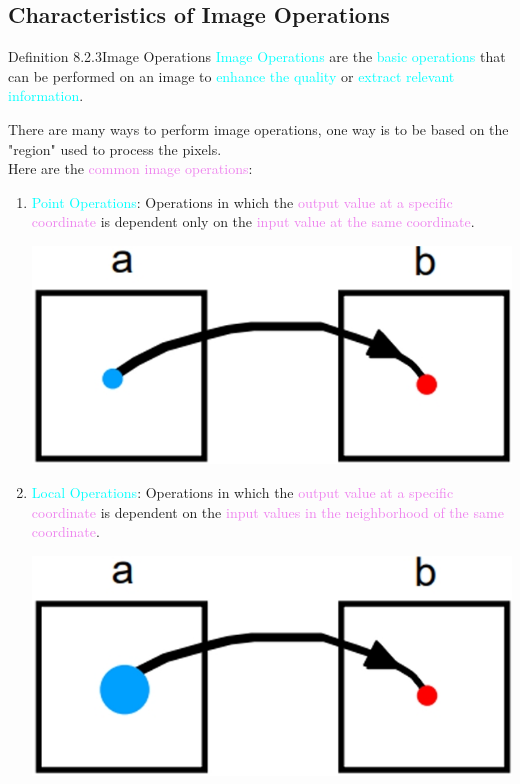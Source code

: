 \documentclass{book}
\begin{document}
\subsection{Characteristics of Image Operations}
\begin{defBox}{Definition 8.2.3}{Image Operations}
    \textcolor{cyan}{Image Operations} are the \textcolor{cyan}{basic operations} that can be performed on an image to \textcolor{cyan}{enhance the quality} or \textcolor{cyan}{extract relevant information}.
\end{defBox}
There are many ways to perform image operations, one way is to be based on the "region" used to process the pixels.\\
Here are the \textcolor{violet}{common image operations}:
\begin{enumerate}
    \item \textcolor{cyan}{Point Operations}: Operations in which the \textcolor{violet}{output value at a specific coordinate} is dependent only on the \textcolor{violet}{input value at the same coordinate}.
    \begin{center}
        \includegraphics[scale=0.22]{chapter 8/ch8_figure5.jpeg}
    \end{center}
    \item \textcolor{cyan}{Local Operations}: Operations in which the \textcolor{violet}{output value at a specific coordinate} is dependent on the \textcolor{violet}{input values in the neighborhood of the same coordinate}.
    \begin{center}
        \includegraphics[scale=0.22]{chapter 8/ch8_figure6.jpeg}

\end{center}
\end{enumerate}
\end{document}

